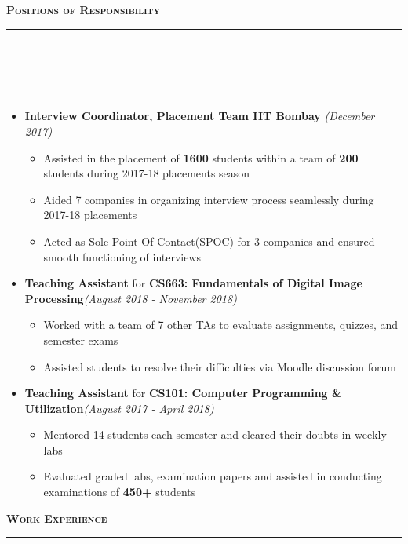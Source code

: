 \documentclass[a4paper,10pt]{article}
\newcommand{\lsep}{-0.5cm}
\newcommand{\resheading}[1]{{\small
        {
            \begin{minipage}
                {0.992\textwidth}\textbf{{\textsc{#1 \vphantom{p\^{E}} }}}
                \\[-0.3cm]
                \hrule
            \end{minipage}
            \\[-0.5cm]
        }
 }}
\begin{document}
\resheading{\textbf{\large Positions of Responsibility}}\\[\lsep] 
\\[-0.35cm]
\begin{itemize}
  \item \textbf{Interview Coordinator,
  Placement Team IIT Bombay} \emph{\hfill(December 2017)} \\[-0.6cm]
  \begin{itemize}
    \item Assisted in the placement of \textbf{1600} students within a team of \textbf{200} students during 2017-18 placements season
    \item Aided 7 companies in organizing interview process seamlessly during 2017-18 placements
    \item Acted as Sole Point Of Contact(SPOC) for 3 companies and ensured smooth functioning of interviews\\[-0.6cm]
  \end{itemize}
  \item \textbf{Teaching Assistant} for \textbf{CS663: Fundamentals of Digital Image Processing}\hfill \emph{(August 2018 - November 2018)}\\[-0.6cm]
    \begin{itemize}
        \item Worked with a team of 7 other TAs to evaluate assignments, quizzes, and semester exams   
        \item Assisted students to resolve their difficulties via Moodle discussion forum\\[-0.6cm]
        \end{itemize} 
    \item \textbf{Teaching Assistant} for  \textbf{CS101: Computer Programming \& Utilization}\hfill \emph{(August 2017 - April 2018)} \\[-0.6cm]
       \begin{itemize}
           \item Mentored 14 students each semester and cleared their doubts in weekly labs
    	   \item Evaluated graded labs, examination papers and assisted in conducting examinations of \textbf{450+} students \\[-0.5cm]
       \end{itemize} 
\end{itemize}
\resheading{\textbf{\large Work Experience}}\\[-0.4cm]
\end{document}

